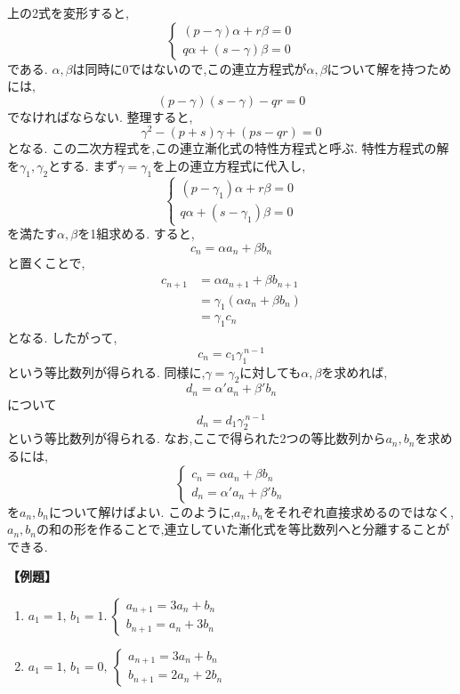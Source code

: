 \documentclass[dvipdfmx,a4paper,11pt,fleqn,openany]{jsbook}
\begin{document}
      上の2式を変形すると,
      \[
      \begin{cases}
        (p-\gamma)\alpha+r\beta=0\\
        q\alpha+(s-\gamma)\beta=0
      \end{cases}
      \]
      である.
      $\alpha,\beta$は同時に$0$ではないので,この連立方程式が$\alpha,\beta$について解を持つためには,
      \[
        (p-\gamma)(s-\gamma)-qr=0
      \]
      でなければならない.
      整理すると,
      \[
        \gamma^2-(p+s)\gamma+(ps-qr)=0
      \]
      となる.
      この二次方程式を,この連立漸化式の特性方程式と呼ぶ.
      特性方程式の解を$\gamma_1,\gamma_2$とする.
      まず$\gamma=\gamma_1$を上の連立方程式に代入し,
      \[
        \begin{cases}
          (p-\gamma_1)\alpha+r\beta=0\\
          q\alpha+(s-\gamma_1)\beta=0
        \end{cases}
      \]
      を満たす$\alpha,\beta$を1組求める.
      すると,
      \[
        c_n=\alpha a_n+\beta b_n
      \]
      と置くことで,
      \begin{align*}
        c_{n+1}&=\alpha a_{n+1}+\beta b_{n+1}\\
        &=\gamma_1(\alpha a_n+\beta b_n)\\
        &=\gamma_1c_n
      \end{align*}
      となる.
      したがって,
      \[
        c_n=c_1\gamma_1^{\,n-1}
      \]
      という等比数列が得られる.
      同様に,$\gamma=\gamma_2$に対しても$\alpha,\beta$を求めれば,
      \[
        d_n=\alpha' a_n+\beta' b_n
      \]
      について
      \[
        d_n=d_1\gamma_2^{\,n-1}
      \]
      という等比数列が得られる.
      なお,ここで得られた2つの等比数列から$a_n,b_n$を求めるには,
      \[
        \begin{cases}
        c_n=\alpha a_n+\beta b_n\\
        d_n=\alpha'a_n+\beta'b_n
        \end{cases}
      \]
      を$a_n,b_n$について解けばよい.
      このように,$a_n,b_n$をそれぞれ直接求めるのではなく,$a_n,b_n$の和の形を作ることで,連立していた漸化式を等比数列へと分離することができる.

      \noindent \textbf{【例題】}
      \begin{enumerate}[label=(\arabic*),parsep=3pt]
        \item $\displaystyle a_1=1,\,b_1=1.\ \begin{cases}a_{n+1}=3a_n+b_n\\ b_{n+1}=a_n+3b_n\end{cases}$
        \item $\displaystyle a_1=1,\,b_1=0,\ \begin{cases}a_{n+1}=3a_n+b_n\\ b_{n+1}=2a_n+2b_n\end{cases}$
      \end{enumerate}
\end{document}
